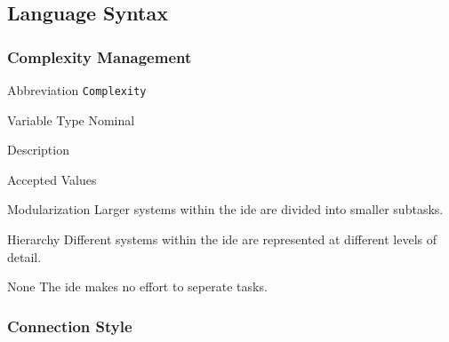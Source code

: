 
\subsection{Language Syntax}
\label{subsec:languagesyntax}

\subsubsection{Complexity Management}
\label{subsubsec:complexity}

\begin{AlignedDesc}
  \item[Abbreviation] \texttt{Complexity}

  \item[Variable Type] Nominal

  \item[Description]

  \item[Accepted Values]

  \begin{AlignedDesc}
    \item[Modularization] Larger systems within the \ac{ide} are divided into smaller subtasks.
    \item[Hierarchy] Different systems within the \ac{ide} are represented at different levels of detail.
    \item[None] The \ac{ide} makes no effort to seperate tasks.
  \end{AlignedDesc}

\end{AlignedDesc}

\subsubsection{Connection Style}
\label{subsubsec:connection}

